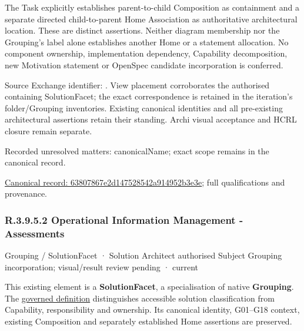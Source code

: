 The Task explicitly establishes parent-to-child Composition as containment and
a separate directed child-to-parent Home Association as authoritative architectural
location. These are distinct assertions. Neither diagram membership nor the
Grouping's label alone establishes another Home or a statement allocation.
No component ownership, implementation dependency, Capability decomposition,
new Motivation statement or OpenSpec candidate incorporation is conferred.



Source Exchange identifier: \texttt{}. View placement corroborates
the authorised containing SolutionFacet; the exact correspondence is retained in the
iteration's folder/Grouping inventories. Existing canonical identities and all
pre-existing architectural assertions retain their standing. Archi visual
acceptance and HCRL closure remain separate.


{\small Recorded unresolved matters: canonicalName; exact scope remains in the canonical record.}\par
{\footnotesize \href{../../../../../../../continuum/grouping/63807867e2d147528542a914952b3e3e.md}{Canonical record: 63807867e2d147528542a914952b3e3e}; full qualifications and provenance.}\par
\subsubsection*{R.3.9.5.2 Operational Information Management - Assessments}
\label{navigation:R.3.9.5.2}

\label{element:f147597cd5e04696887257c6316eedf7}
{\small Grouping / SolutionFacet · Solution Architect authorised Subject Grouping incorporation; visual/result review pending · current}\par

This existing element is a \textbf{SolutionFacet}, a specialisation of native
\textbf{Grouping}. The \href{\detokenize{../../../../../../../governance/continuum-representation.md#solutionfacet-classification--1119-candidate}}{governed definition}
distinguishes accessible solution classification from Capability, responsibility
and ownership. Its canonical identity, G01–G18 context, existing Composition
and separately established Home assertions are preserved.



